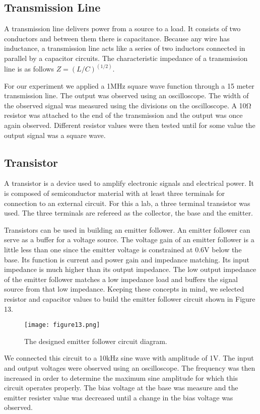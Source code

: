 \documentclass[12pt]{article}
\begin{document}
\subsection {Transmission Line}
A transmission line delivers power from a source to a load. It consists
of two conductors and between them there is capacitance. Because any
wire has inductance, a transmission line acts like a series of two
inductors connected in parallel by a capacitor circuits. The
characteristic impedance of a transmission line is as follows
$Z=(L/C)^(1/2)$.

For our experiment we applied a 1MHz square wave function through a 15
meter transmission line. The output was observed using an
oscilloscope. The width of the observed signal was measured using the
divisions on the oscilloscope. A 10Ω resistor was attached to the end of
the transmission and the output was once again observed. Different
resistor values were then tested until for some value the output signal
was a square wave.

\subsection {Transistor}
A transistor is a device used to amplify electronic signals and
electrical power. It is composed of semiconductor material with at least
three terminals for connection to an external circuit. For this a lab, a
three terminal transistor was used. The three terminals are refereed as
the collector, the base and the emitter.
 

Transistors can be used in building an emitter follower. An emitter
follower can serve as a buffer for a voltage source. The voltage gain of
an emitter follower is a little less than one since the emitter voltage
is constrained at 0.6V below the base. Its function is current and power
gain and impedance matching. Its input impedance is much higher than its
output impedance. The low output impedance of the emitter follower
matches a low impedance load and buffers the signal source from that low
impedance. Keeping these concepts in mind, we selected resistor and
capacitor values to build the emitter follower circuit shown in Figure
13.

\begin {figure}[!h]
\centering
\texttt{[image: figure13.png]}
\caption{\label{rvd} The designed emitter follower circuit diagram.}
\end {figure}

We connected this circuit to a 10kHz sine wave with amplitude of 1V. The
input and output voltages were observed using an oscilloscope. The
frequency was then increased in order to determine the maximum sine
amplitude for which this circuit operates properly. The bias voltage at
the base was measure and the emitter resister value was decreased until
a change in the bias voltage was observed.
 
\end{document}
